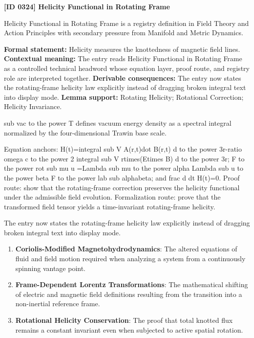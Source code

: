 \clearpage
\noindent\textbf{[ID 0324] Helicity Functional in Rotating Frame}\par
\vspace{0.35em}
\begingroup\small
{}
Helicity Functional in Rotating Frame is a registry definition in Field Theory and Action Principles with secondary pressure from Manifold and Metric Dynamics.

\begingroup\footnotesize\setlength{\emergencystretch}{3em}\sloppy
\textbf{Formal statement:} Helicity measures the knottedness of magnetic field lines. \textbf{Contextual meaning:} The entry reads Helicity Functional in Rotating Frame as a controlled technical headword whose equation layer, proof route, and registry role are interpreted together. \textbf{Derivable consequences:} The entry now states the rotating-frame helicity law explicitly instead of dragging broken integral text into display mode. \textbf{Lemma support:} Rotating Helicity; Rotational Correction; Helicity Invariance.\par
\endgroup

sub vac to the power T defines vacuum energy density as a spectral integral normalized by the four-dimensional Trawin base scale.

Equation anchors: H(t)=integral sub V A(r,t)dot B(r,t) d to the power 3r-ratio omega c to the power 2 integral sub V rtimes(Etimes B) d to the power 3r; F to the power rot sub mu u =Lambda sub mu to the power alpha Lambda sub u to the power beta F to the power lab sub alphabeta; and frac d dt H(t)=0. Proof route: show that the rotating-frame correction preserves the helicity functional under the admissible field evolution. Formalization route: prove that the transformed field tensor yields a time-invariant rotating-frame helicity.

The entry now states the rotating-frame helicity law explicitly instead of dragging broken integral text into display mode.
\endgroup

\begin{enumerate}[leftmargin=1.6em,itemsep=6pt,topsep=4pt]
\item \textbf{Coriolis-Modified Magnetohydrodynamics}: The altered equations of fluid and field motion required when analyzing a system from a continuously spinning vantage point.
\item \textbf{Frame-Dependent Lorentz Transformations}: The mathematical shifting of electric and magnetic field definitions resulting from the transition into a non-inertial reference frame.
\item \textbf{Rotational Helicity Conservation}: The proof that total knotted flux remains a constant invariant even when subjected to active spatial rotation.
\end{enumerate}

